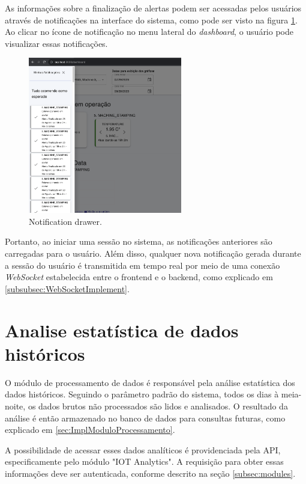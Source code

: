 As informações sobre a finalização de alertas podem ser acessadas pelos usuários através de notificações na interface do sistema, como pode ser visto na figura \ref{fig:notificationDrawer}. Ao clicar no ícone de notificação no menu lateral do \textit{dashboard}, o usuário pode visualizar essas notificações.

\begin{figure}[htbp]
	\centering
	\includegraphics[width=0.6\textwidth]{images/notification.png}
	\caption{Notification drawer.}
	\label{fig:notificationDrawer}
\end{figure}


Portanto, ao iniciar uma sessão no sistema, as notificações anteriores são carregadas para o usuário. Além disso, qualquer nova notificação gerada durante a sessão do usuário é transmitida em tempo real por meio de uma conexão \textit{WebSocket} estabelecida entre o frontend e o backend, como explicado em \ref{subsubsec:WebSocketImplement}.


\section[Analise estatística de dados históricos]{Analise estatística de dados históricos}\label{sec:histicalGraphs}

O módulo de processamento de dados é responsável pela análise estatística dos dados históricos. Seguindo o parâmetro padrão do sistema, todos os dias à meia-noite, os dados brutos não processados são lidos e analisados. O resultado da análise é então armazenado no banco de dados para consultas futuras, como explicado em \ref{sec:ImplModuloProcessamento}.

A possibilidade de acessar esses dados analíticos é providenciada pela \gls{API}, especificamente pelo módulo "IOT Analytics". A requisição para obter essas informações deve ser autenticada, conforme descrito na seção \ref{subsec:modules}.

